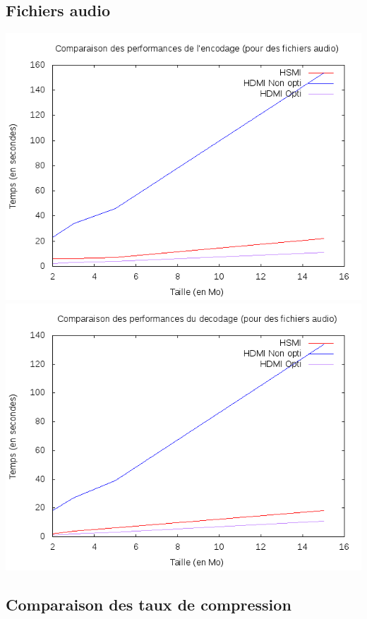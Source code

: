 \documentclass{article}
\begin{document}
\subsection{Fichiers audio}
\begin{center}
\includegraphics[scale=0.5]{Perf/audio/encodecompaudio2.png}
\includegraphics[scale=0.5]{Perf/audio/decodecompaudio2.png}
\end{center}

\subsection{Comparaison des taux de compression}
\end{document}
